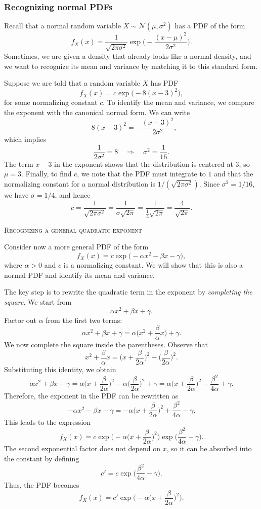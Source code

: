 \subsubsection{Recognizing normal PDFs}

Recall that a normal random variable \(X \sim \mathcal{N}(\mu,\sigma^{2})\) has a PDF of the form
\[
f_{X}(x)
=
\frac{1}{\sqrt{2\pi\sigma^{2}}}
\exp\Big(-\frac{(x-\mu)^{2}}{2\sigma^{2}}\Big).
\]
Sometimes, we are given a density that already looks like a normal density, and we want to recognize its mean and variance by matching it to this standard form.

Suppose we are told that a random variable \(X\) has PDF
\[
f_{X}(x)
=
c \exp\Big(-8(x-3)^{2}\Big),
\]
for some normalizing constant \(c\).  
To identify the mean and variance, we compare the exponent with the canonical normal form.  
We can write
\[
-8(x-3)^{2}
=
-\frac{(x-3)^{2}}{2\sigma^{2}},
\]
which implies
\[
\frac{1}{2\sigma^{2}}
=
8
\quad\Rightarrow\quad
\sigma^{2}
=
\frac{1}{16}.
\]
The term \(x-3\) in the exponent shows that the distribution is centered at \(3\), so \(\mu = 3\).  
Finally, to find \(c\), we note that the PDF must integrate to \(1\) and that the normalizing constant for a normal distribution is \(1/(\sqrt{2\pi\sigma^{2}})\).  
Since \(\sigma^{2} = 1/16\), we have \(\sigma = 1/4\), and hence
\[
c
=
\frac{1}{\sqrt{2\pi\sigma^{2}}}
=
\frac{1}{\sigma\sqrt{2\pi}}
=
\frac{1}{\tfrac{1}{4}\sqrt{2\pi}}
=
\frac{4}{\sqrt{2\pi}}.
\]

\bigskip
\textsc{Recognizing a general quadratic exponent}

Consider now a more general PDF of the form
\[
f_{X}(x)
=
c \exp\big(-\alpha x^{2} - \beta x - \gamma\big),
\]
where \(\alpha > 0\) and \(c\) is a normalizing constant.  
We will show that this is also a normal PDF and identify its mean and variance.

The key step is to rewrite the quadratic term in the exponent by \textit{completing the square}.  
We start from
\[
\alpha x^{2} + \beta x + \gamma.
\]
Factor out \(\alpha\) from the first two terms:
\[
\alpha x^{2} + \beta x + \gamma
=
\alpha\Big(x^{2} + \frac{\beta}{\alpha}x\Big) + \gamma.
\]
We now complete the square inside the parentheses.  
Observe that
\[
x^{2} + \frac{\beta}{\alpha}x
=
\Big(x + \frac{\beta}{2\alpha}\Big)^{2}
-
\Big(\frac{\beta}{2\alpha}\Big)^{2}.
\]
Substituting this identity, we obtain
\[
\alpha x^{2} + \beta x + \gamma
=
\alpha\Big(x + \frac{\beta}{2\alpha}\Big)^{2}
-
\alpha\Big(\frac{\beta}{2\alpha}\Big)^{2}
+
\gamma
=
\alpha\Big(x + \frac{\beta}{2\alpha}\Big)^{2}
-
\frac{\beta^{2}}{4\alpha}
+
\gamma.
\]
Therefore, the exponent in the PDF can be rewritten as
\[
-\alpha x^{2} - \beta x - \gamma
=
-\alpha\Big(x + \frac{\beta}{2\alpha}\Big)^{2}
+
\frac{\beta^{2}}{4\alpha}
-
\gamma.
\]
This leads to the expression
\[
f_{X}(x)
=
c \exp\Big(-\alpha\Big(x + \frac{\beta}{2\alpha}\Big)^{2}\Big)
\exp\Big(\frac{\beta^{2}}{4\alpha} - \gamma\Big).
\]
The second exponential factor does not depend on \(x\), so it can be absorbed into the constant by defining
\[
c'
=
c \exp\Big(\frac{\beta^{2}}{4\alpha} - \gamma\Big).
\]
Thus, the PDF becomes
\[
f_{X}(x)
=
c'
\exp\Big(-\alpha\Big(x + \frac{\beta}{2\alpha}\Big)^{2}\Big).
\]

